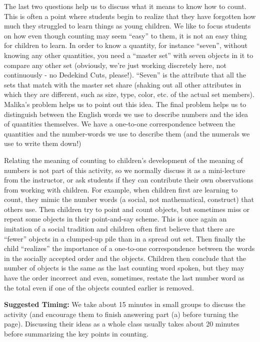 \documentclass[handout]{ximera}
\begin{document}
\begin{instructorNotes}
The last two questions help us to discuss what it means to know how to count.  This is often a point where students begin to realize that they have forgotten how much they struggled to learn things as young children.  We like to focus students on how even though counting may seem ``easy'' to them, it is not an easy thing for children to learn.
In order to know a quantity, for instance ``seven'', without knowing any other quantities, you need a ``master set'' with seven objects in it to compare any other set (obviously, we're just working discretely here, not continuously - no Dedekind Cuts, please!).  ``Seven'' is the attribute that all the sets that match with the master set share (shaking out all other attributes in which they are different, such as size, type, color, etc. of the actual set members). Malika's problem helps us to point out this idea. The final problem helps us to distinguish between the English words we use to describe numbers and the idea of quantities themselves. We have a one-to-one correspondence between the quantities and the number-words we use to describe them (and the numerals we use to write them down!) 


Relating the meaning of counting to children's development of the meaning of numbers is not part of this activity, so we normally discuss it as a mini-lecture from the instructor, or ask students if they can contribute their own observations from working with children. For example, when children first are learning to count, they mimic the number words (a social, not mathematical, construct) that others use.  Then children try to point and count objects, but sometimes miss or repeat some objects in their point-and-say scheme.  This is once again an imitation of a social tradition and children often first believe that there are ``fewer'' objects in a clumped-up pile than in a spread out set.  Then finally the child ``realizes'' the importance of a one-to-one correspondence between the words in the socially accepted order and the objects.  Children then conclude that the number of objects is the same as the last counting word spoken, but they may have the order incorrect and even, sometimes, restate the last number word as the total even if one of the objects counted earlier is removed.


{\bf Suggested Timing:} We take about 15 minutes in small groups to discuss the activity (and encourage them to finish answering part (a) before turning the page).  
Discussing their ideas as a whole class usually takes about 20 minutes before summarizing the key points in counting.  



\end{instructorNotes}
\end{document}
